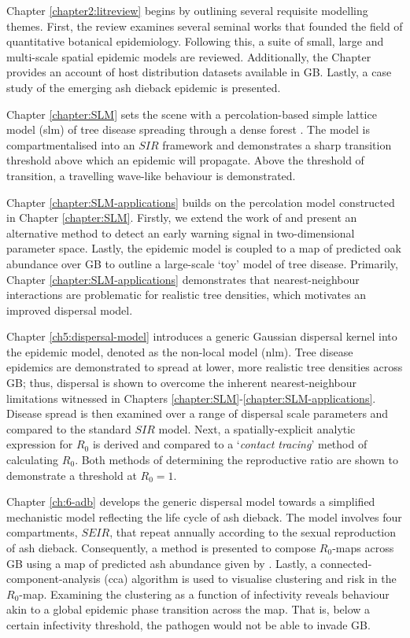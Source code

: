 Chapter \ref{chapter2:litreview} begins by outlining several requisite modelling themes. First, the review examines
several seminal works that founded the field of quantitative botanical epidemiology. Following this,
a suite of small, large and multi-scale spatial epidemic models are reviewed. Additionally,
the Chapter provides an account of host distribution datasets available in GB. Lastly, a case study of the emerging
ash dieback epidemic is presented.

Chapter \ref{chapter:SLM} sets the scene with a percolation-based simple lattice model (\acrshort{slm}) of tree
disease spreading through a dense forest \cite{OROZCOFUENTES201912}. The model is compartmentalised
into an $SIR$ framework and demonstrates a sharp transition threshold above which an epidemic will propagate. 
Above the threshold of transition, a travelling wave-like behaviour is demonstrated.

Chapter \ref{chapter:SLM-applications} builds on the percolation model constructed in Chapter \ref{chapter:SLM}.
Firstly, we extend the work of \cite{OROZCOFUENTES201912} and present an alternative method to detect an early
warning signal in two-dimensional parameter space. Lastly, the epidemic model is coupled to a map of predicted
oak abundance over GB \cite{hill.data} to outline a large-scale `toy' model of tree disease. 
Primarily, Chapter \ref{chapter:SLM-applications} demonstrates that nearest-neighbour interactions are problematic
for realistic tree densities, which motivates an improved dispersal model. 

Chapter \ref{ch5:dispersal-model} introduces a generic Gaussian dispersal kernel into the epidemic model, denoted as the non-local model (\acrshort{nlm}). 
Tree disease epidemics are demonstrated to spread at lower, more realistic tree densities across GB; thus, dispersal is shown to overcome 
the inherent nearest-neighbour limitations witnessed in Chapters \ref{chapter:SLM}-\ref{chapter:SLM-applications}. Disease spread is then examined over a range of dispersal scale parameters and compared to the standard $SIR$ model. Next, a spatially-explicit analytic expression for $R_0$ is derived and compared to a `\textit{contact tracing}' method of calculating $R_0$.
Both methods of determining the reproductive ratio are shown to demonstrate a threshold at $R_0=1$.

Chapter \ref{ch:6-adb} develops the generic dispersal model towards a simplified mechanistic
model reflecting the life cycle of ash dieback. The model involves four compartments, $SEIR$, that repeat
annually according to the sexual reproduction of ash dieback. Consequently, a method is presented to compose $R_0$-maps
across GB using a map of predicted ash abundance given by \cite{hill.data}. Lastly, a connected-component-analysis
(\acrshort{cca}) algorithm is used to visualise  clustering and risk in the $R_0$-map. Examining the clustering as a function
of infectivity reveals behaviour akin to a global epidemic phase transition across the map. That is, below a certain infectivity threshold, 
the pathogen would not be able to invade GB.

